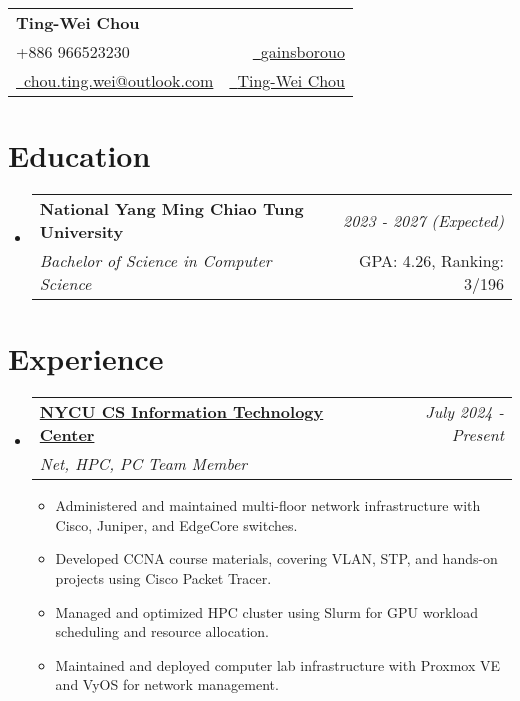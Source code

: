 \documentclass[a4paper,11pt]{article}
\makeatletter
\newcommand{\resumeSubheading}[4]{
\vspace{0.5mm}\item
    \begin{tabular*}{0.98\textwidth}[t]{l@{\extracolsep{\fill}}r}
        \textbf{#1} & \textit{\footnotesize{#4}} \\
        \textit{\footnotesize{#3}} &  \footnotesize{#2}\\
    \end{tabular*}
    \vspace{-2.4mm}
}
\newcommand{\resumeSubHeadingListStart}{\begin{itemize}[leftmargin=*,labelsep=0mm]}
\newcommand{\resumeItemListStart}{\begin{justify}\begin{itemize}[leftmargin=3ex, rightmargin=2ex, noitemsep,labelsep=1.2mm,itemsep=0mm]\small}
\newcommand{\resumeSubHeadingListEnd}{\end{itemize}\vspace{2mm}}
\newcommand{\resumeItemListEnd}{\end{itemize}\end{justify}\vspace{-2mm}}
\newcommand{\name}{Ting-Wei Chou} %
\newcommand{\phone}{966523230}
\newcommand{\emaila}{chou.ting.wei@outlook.com}
\makeatother
\begin{document}
\selectfont


\parbox{\dimexpr\linewidth-0.3cm\relax}{
\begin{tabularx}{\linewidth}{L r} \\
  \textbf{\Large \name} \\ 
  {\raisebox{0em}{\footnotesize \faPhone} +886 \phone} & \href{https://github.com/gainsborouo}{\raisebox{0.0\height}{\footnotesize \faGithub}\ {gainsborouo}}\\
  \href{mailto:\emaila}{\raisebox{0.0\height}{\footnotesize 
 \faEnvelope}\ {\emaila}}&\href{https://www.linkedin.com/in/userwei}{\raisebox{0.0\height}{\footnotesize \faLinkedin}\ {Ting-Wei Chou}}
\end{tabularx}
}

\section{\textbf{Education}}
  \resumeSubHeadingListStart
    \resumeSubheading
      {National Yang Ming Chiao Tung University}{GPA: 4.26, Ranking: 3/196}
      {Bachelor of Science in Computer Science}{2023 - 2027 (Expected)}
  \resumeSubHeadingListEnd
\vspace{-5.5mm}
%



\section{\textbf{Experience}}
  \resumeSubHeadingListStart
    \resumeSubheading
      {\href{https://www.linkedin.com/company/nycu-csit/}{NYCU CS Information Technology Center}}{}
      {Net, HPC, PC Team Member}{July 2024 - Present}
      \vspace{-2.0mm}
      \resumeItemListStart
        \item {Administered and maintained multi-floor network infrastructure with Cisco, Juniper, and EdgeCore switches.}
        \item {Developed CCNA course materials, covering VLAN, STP, and hands-on projects using Cisco Packet Tracer.}
        \item {Managed and optimized HPC cluster using Slurm for GPU workload scheduling and resource allocation.}
        \item {Maintained and deployed computer lab infrastructure with Proxmox VE and VyOS for network management.}
      \resumeItemListEnd
  \resumeSubHeadingListEnd
\vspace{-8.5mm}
\end{document}

